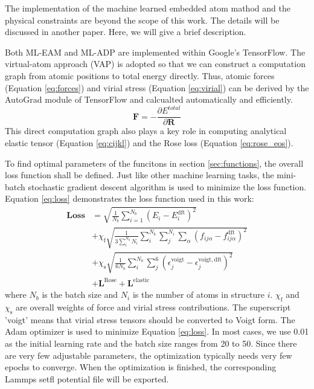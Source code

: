\documentclass[prb,reprint]{revtex4-2}
\begin{document}
The implementation of the machine learned embedded atom mathod and the physical
constraints are beyond the scope of this work. The details will be discussed
in another paper. Here, we will give a brief description.

Both ML-EAM and ML-ADP are implemented within Google's TensorFlow. The 
virtual-atom approach (VAP) is adopted so that we can construct a computation 
graph from atomic positions to total energy directly. Thus, atomic forces 
(Equation \ref{eq:forces}) and virial stress (Equation \ref{eq:virial}) can be 
derived by the AutoGrad module of TensorFlow and calcualted automatically and 
efficiently. 
\begin{equation}
\label{eq:forces}
\mathbf{F} = -\frac{\partial E^{total}}{\partial \mathbf{R}}
\end{equation}
This direct computation graph also plays a key role in computing analytical 
elastic tensor (Equation \ref{eq:cijkl}) and the Rose loss 
(Equation \ref{eq:rose_eos}).
 
To find optimal parameters of the funcitons in section \ref{sec:functions}, the 
overall loss function shall be defined. Just like other machine learning tasks, 
the mini-batch stochastic gradient descent algorithm is used to minimize the 
loss function. Equation \ref{eq:loss} demonstrates the loss function used in 
this work:
\begin{align}
\label{eq:loss}
\mathbf{Loss} & = \sqrt{\frac{1}{N_{b}}\sum_{i=1}^{N_{b}}{\left(
    E_{i} - E_{i}^{\mathrm{dft}}
\right)^2}} \nonumber \\
& + \chi_{\mathrm{f}}\sqrt{
    \frac{1}{3\sum_{i}^{N_{b}}{N_i}}\sum_{i}^{N_b}{\sum_{j}^{N_i}{
        \sum_{\alpha}{
            \left(f_{ij\alpha} - f_{ij\alpha}^{\mathrm{dft}}\right)^2
        }
    }}
} \nonumber \\
& + \chi_{\mathrm{s}}\sqrt{\frac{1}{6N_b}\sum_{i}^{N_b}{
    \sum_{j}^{6}{
        \left(
            \epsilon^{\mathrm{voigt}}_{j} - \epsilon^{\mathrm{voigt,dft}}_{j}
        \right)^2
    }
}} \nonumber \\
& + \mathbf{L}^{\mathrm{Rose}} + \mathbf{L}^{\mathrm{elastic}}
\end{align} 
where $N_{b}$ is the batch size and $N_i$ is the number of atoms in structure 
$i$. $\chi_{\mathrm{f}}$ and $\chi_{\mathrm{s}}$ are overall weights of force 
and virial stress contributions. The superscript 'voigt' means that virial 
stress tensors should be converted to Voigt form. The Adam optimizer is used to 
minimize Equation \ref{eq:loss}. In most cases, we use 0.01 as the initial 
learning rate and the batch size ranges from 20 to 50. Since there are very few
adjustable parameters, the optimization typically needs very few epochs to 
converge. When the optimization is finished, the corresponding Lammps setfl 
potential file will be exported.
\end{document}
